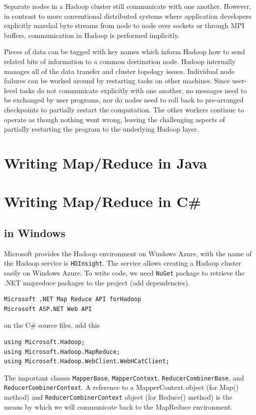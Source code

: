 Separate nodes in a Hadoop cluster still communicate with one another. However,
in contrast to more conventional distributed systems where application
developers explicitly marshal byte streams from node to node over sockets or
through MPI buffers, communication in Hadoop is performed implicitly.

Pieces of data can be tagged with key names which inform Hadoop how to send
related bits of information to a common destination node. Hadoop internally
manages all of the data transfer and cluster topology issues.
Individual node failures can be worked around by restarting tasks on other
machines. Since user-level tasks do not communicate explicitly with one another,
no messages need to be exchanged by user programs, nor do nodes need to roll
back to pre-arranged checkpoints to partially restart the computation. 
The other workers continue to operate as though nothing went wrong, leaving the
challenging aspects of partially restarting the program to the underlying Hadoop
layer. 

\section{Writing Map/Reduce in Java}


\section{Writing Map/Reduce in C\#}

\subsection{in Windows}

Microsoft provides the Hadoop environment on Windows Azure, with the name of the
Hadoop service is \verb!HDInsight!. The service allows creating a Hadoop cluster
easily on Windows Azure. To write code, we need \verb!NuGet! package to retrieve
the .NET mapreduce packages to the project (add dependencies).
\begin{verbatim}
Microsoft .NET Map Reduce API forHadoop
Microsoft ASP.NET Web API
\end{verbatim}

on the C\# source files, add this
\begin{verbatim}
using Microsoft.Hadoop;
using Microsoft.Hadoop.MapReduce;
using Microsoft.Hadoop.WebClient.WebHCatClient;
\end{verbatim}

The important classes \verb!MapperBase!, \verb!MapperContext!, 
\verb!ReducerCombinerBase!, and \verb!ReducerCombinerContext!.
A reference to a MapperContext object (for Map() method) and
\verb!ReducerCombinerContext! object (for Reduce() method) is the means by
which we will communicate back to the MapReduce environment.

